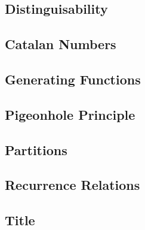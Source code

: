 \documentclass[12pt]{book}
\begin{document}
\section{Distinguisability}

\section{Catalan Numbers}

\section{Generating Functions}

\section{Pigeonhole Principle}

\section{Partitions}

\section{Recurrence Relations}



 \begin{appendices}               %

 \chapter{Title}\label{AppendixA}
 	\blindduck[maths]
 \end{appendices}

\end{document}
